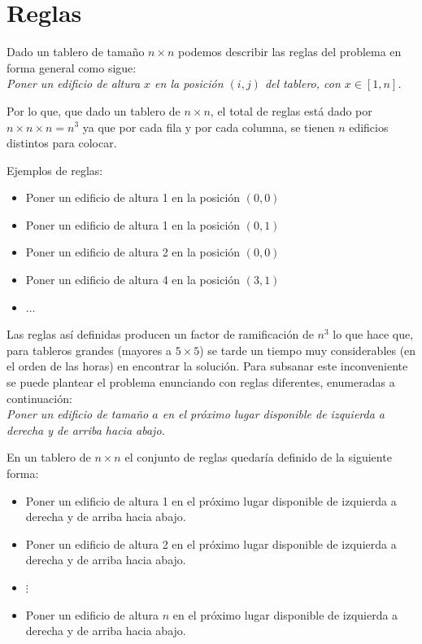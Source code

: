\documentclass[%
	final,
	reprint,
	notitlepage,
	narroweqnarray,
	inline,
	twoside,
	invited
	]{ieee}
\begin{document}
\section{Reglas}

\par Dado un tablero de tamaño $n\times n$ podemos describir las reglas del problema en forma general como sigue:\\

\emph{Poner un edificio de altura $x$ en la posición $(i,j)$ del tablero, con $x \in [1, n]$.}\\

\par Por lo que, que dado un tablero de $n\times n$, el total de reglas está dado por $n \times {n \times n} = n^3$ ya que por cada fila y por cada columna, se tienen $n$ edificios distintos para colocar. 
\par Ejemplos de reglas:
\begin{itemize}
\item Poner un edificio de altura 1 en la posición $(0,0)$
\item Poner un edificio de altura 1 en la posición $(0,1)$
\item Poner un edificio de altura 2 en la posición $(0,0)$
\item Poner un edificio de altura 4 en la posición $(3,1)$
\item $\ldots$

\end{itemize}

\par Las reglas así definidas producen un factor de ramificación de $n^3$ lo que hace que, para tableros grandes (mayores a $5\times5$) se tarde un tiempo muy considerables (en el orden de las horas) en encontrar la solución. Para subsanar este inconveniente se puede plantear el problema enunciando con reglas diferentes, enumeradas a continuación:\\

\emph{Poner un edificio de tamaño $a$ en el próximo lugar disponible de izquierda a derecha y de arriba hacia abajo.}\\

\par En un tablero de $n\times n$ el conjunto de reglas quedaría definido de la siguiente forma:\\

\begin{itemize}
\item Poner un edificio de altura 1 en el próximo lugar disponible de izquierda a derecha y de arriba hacia abajo.
\item Poner un edificio de altura 2 en el próximo lugar disponible de izquierda a derecha y de arriba hacia abajo.
\item $\vdots$
\item Poner un edificio de altura $n$ en el próximo lugar disponible de izquierda a derecha y de arriba hacia abajo.
\end{itemize}
\end{document}
